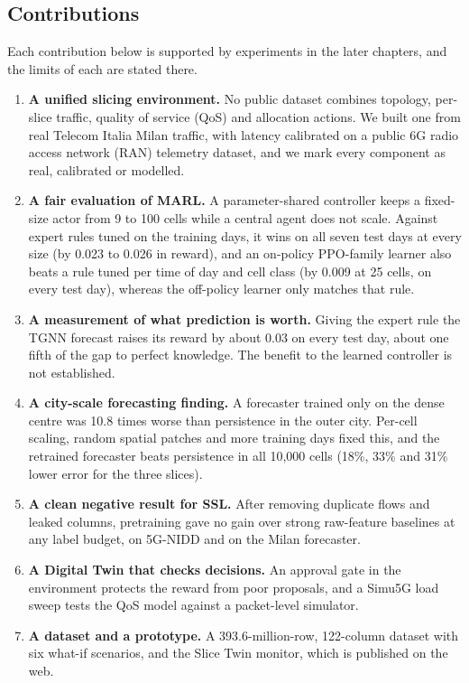 \subsection{Contributions}
Each contribution below is supported by experiments in the later chapters, and the limits of each are stated there.
\begin{enumerate}
	\item \textbf{A unified slicing environment.} No public dataset combines topology, per-slice traffic, quality of service (QoS) and allocation actions. We built one from real Telecom Italia Milan traffic, with latency calibrated on a public 6G radio access network (RAN) telemetry dataset, and we mark every component as real, calibrated or modelled.
	\item \textbf{A fair evaluation of MARL.} A parameter-shared controller keeps a fixed-size actor from 9 to 100 cells while a central agent does not scale. Against expert rules tuned on the training days, it wins on all seven test days at every size (by 0.023 to 0.026 in reward), and an on-policy PPO-family learner also beats a rule tuned per time of day and cell class (by 0.009 at 25 cells, on every test day), whereas the off-policy learner only matches that rule.
	\item \textbf{A measurement of what prediction is worth.} Giving the expert rule the TGNN forecast raises its reward by about 0.03 on every test day, about one fifth of the gap to perfect knowledge. The benefit to the learned controller is not established.
	\item \textbf{A city-scale forecasting finding.} A forecaster trained only on the dense centre was 10.8 times worse than persistence in the outer city. Per-cell scaling, random spatial patches and more training days fixed this, and the retrained forecaster beats persistence in all 10{,}000 cells (18\%, 33\% and 31\% lower error for the three slices).
	\item \textbf{A clean negative result for SSL.} After removing duplicate flows and leaked columns, pretraining gave no gain over strong raw-feature baselines at any label budget, on 5G-NIDD and on the Milan forecaster.
	\item \textbf{A Digital Twin that checks decisions.} An approval gate in the environment protects the reward from poor proposals, and a Simu5G load sweep tests the QoS model against a packet-level simulator.
	\item \textbf{A dataset and a prototype.} A 393.6-million-row, 122-column dataset with six what-if scenarios, and the Slice Twin monitor, which is published on the web.
\end{enumerate}

